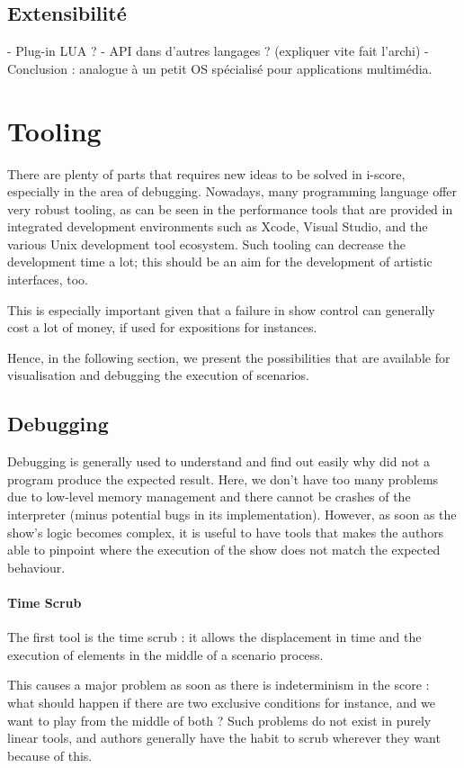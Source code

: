 \documentclass{sigchi}
\begin{document}
\subsection{Extensibilité}
- Plug-in LUA ? 
- API dans d'autres langages ? (expliquer vite fait l'archi)
- Conclusion : analogue à un petit OS spécialisé pour applications multimédia.

\section{Tooling}
There are plenty of parts that requires new ideas to be solved in i-score, especially in the area of debugging. Nowadays, many programming language offer very robust tooling, as can be seen in the performance tools that are provided in integrated development environments such as Xcode, Visual Studio, and the various Unix development tool ecosystem\cite{spinellis2014software}. Such tooling can decrease the development time a lot; this should be an aim for the development of artistic interfaces, too.

This is especially important given that a failure in show control can generally cost a lot of money, if used for expositions for instances.

Hence, in the following section, we present the possibilities that are available for visualisation and debugging the execution of scenarios.


\subsection{Debugging}
Debugging is generally used to understand and find out easily why did not a program produce the expected result. Here, we don't have too many problems due to low-level memory management and there cannot be crashes of the interpreter (minus potential bugs in its implementation).  However, as soon as the show's logic becomes complex, it is useful to have tools that makes the authors able to pinpoint where the execution of the show does not match the expected behaviour.

\paragraph{Time Scrub}
The first tool is the time scrub : it allows the displacement in time and the execution of elements in the middle of a scenario process. 

This causes a major problem as soon as there is indeterminism in the score : what should happen if there are two exclusive conditions for instance, and we want to play from the middle of both ? Such problems do not exist in purely linear tools, and authors generally have the habit to scrub wherever they want because of this.
\end{document}
